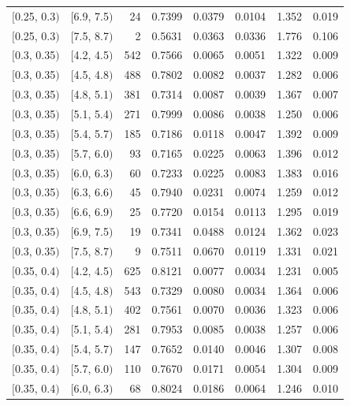 \documentclass[11pt]{article}
\begin{document}
\begin{longtable}{| l | l | r | r | r | r | r | r |}
        $[$0.25, 0.3$)$ & $[$6.9, 7.5$)$ & 24 & 0.7399 & 0.0379 & 0.0104 & 1.352 & 0.019 \\
        $[$0.25, 0.3$)$ & $[$7.5, 8.7$)$ & 2 & 0.5631 & 0.0363 & 0.0336 & 1.776 & 0.106 \\
        $[$0.3, 0.35$)$ & $[$4.2, 4.5$)$ & 542 & 0.7566 & 0.0065 & 0.0051 & 1.322 & 0.009 \\
        $[$0.3, 0.35$)$ & $[$4.5, 4.8$)$ & 488 & 0.7802 & 0.0082 & 0.0037 & 1.282 & 0.006 \\
        $[$0.3, 0.35$)$ & $[$4.8, 5.1$)$ & 381 & 0.7314 & 0.0087 & 0.0039 & 1.367 & 0.007 \\
        $[$0.3, 0.35$)$ & $[$5.1, 5.4$)$ & 271 & 0.7999 & 0.0086 & 0.0038 & 1.250 & 0.006 \\
        $[$0.3, 0.35$)$ & $[$5.4, 5.7$)$ & 185 & 0.7186 & 0.0118 & 0.0047 & 1.392 & 0.009 \\
        $[$0.3, 0.35$)$ & $[$5.7, 6.0$)$ & 93 & 0.7165 & 0.0225 & 0.0063 & 1.396 & 0.012 \\
        $[$0.3, 0.35$)$ & $[$6.0, 6.3$)$ & 60 & 0.7233 & 0.0225 & 0.0083 & 1.383 & 0.016 \\
        $[$0.3, 0.35$)$ & $[$6.3, 6.6$)$ & 45 & 0.7940 & 0.0231 & 0.0074 & 1.259 & 0.012 \\
        $[$0.3, 0.35$)$ & $[$6.6, 6.9$)$ & 25 & 0.7720 & 0.0154 & 0.0113 & 1.295 & 0.019 \\
        $[$0.3, 0.35$)$ & $[$6.9, 7.5$)$ & 19 & 0.7341 & 0.0488 & 0.0124 & 1.362 & 0.023 \\
        $[$0.3, 0.35$)$ & $[$7.5, 8.7$)$ & 9 & 0.7511 & 0.0670 & 0.0119 & 1.331 & 0.021 \\
        $[$0.35, 0.4$)$ & $[$4.2, 4.5$)$ & 625 & 0.8121 & 0.0077 & 0.0034 & 1.231 & 0.005 \\
        $[$0.35, 0.4$)$ & $[$4.5, 4.8$)$ & 543 & 0.7329 & 0.0080 & 0.0034 & 1.364 & 0.006 \\
        $[$0.35, 0.4$)$ & $[$4.8, 5.1$)$ & 402 & 0.7561 & 0.0070 & 0.0036 & 1.323 & 0.006 \\
        $[$0.35, 0.4$)$ & $[$5.1, 5.4$)$ & 281 & 0.7953 & 0.0085 & 0.0038 & 1.257 & 0.006 \\
        $[$0.35, 0.4$)$ & $[$5.4, 5.7$)$ & 147 & 0.7652 & 0.0140 & 0.0046 & 1.307 & 0.008 \\
        $[$0.35, 0.4$)$ & $[$5.7, 6.0$)$ & 110 & 0.7670 & 0.0171 & 0.0054 & 1.304 & 0.009 \\
        $[$0.35, 0.4$)$ & $[$6.0, 6.3$)$ & 68 & 0.8024 & 0.0186 & 0.0064 & 1.246 & 0.010 \\

\end{longtable}
\end{document}

